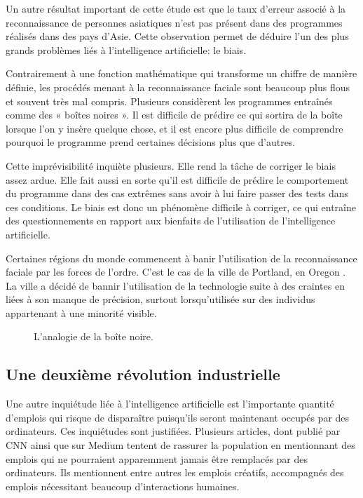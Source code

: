 \documentclass[letterpaper,10pt,french]{sphinxmanual}
\begin{document}
Un autre résultat important de cette étude est que le taux d’erreur associé à la
reconnaissance de personnes asiatiques n’est pas présent dans des programmes
réalisés dans des pays d’Asie. Cette observation permet de déduire l’un des plus
grands problèmes liés à l’intelligence artificielle: le biais.

Contrairement à une fonction mathématique qui transforme un chiffre de manière
définie, les procédés menant à la reconnaissance faciale sont beaucoup plus
flous et souvent très mal compris. Plusieurs considèrent les programmes
entraînés comme des « boîtes noires ». Il est difficile de prédire ce qui sortira
de la boîte lorsque l’on y insère quelque chose, et il est encore plus difficile
de comprendre pourquoi le programme prend certaines décisions plus que d’autres.

Cette imprévisibilité inquiète plusieurs. Elle rend la tâche de corriger le
biais assez ardue. Elle fait aussi en sorte qu’il est difficile de prédire le
comportement du programme dans des cas extrêmes sans avoir à lui faire passer
des tests dans ces conditions. Le biais est donc un phénomène difficile à
corriger, ce qui entraîne des questionnements en rapport aux bienfaits de
l’utilisation de l’intelligence artificielle.

Certaines régions du monde
commencent à banir l’utilisation de la reconnaissance faciale par les forces
de l’ordre. C’est le cas de la ville de Portland, en Oregon .
La ville a décidé de bannir l’utilisation de la technologie suite à des craintes
en liées à son manque de précision, surtout lorsqu’utilisée sur des individus
appartenant à une minorité visible.

\begin{figure}[htbp]
\centering
\capstart

\noindent{}
\caption{L’analogie de la boîte noire.}\label{\detokenize{enonce_sujet:boite-noire}}\end{figure}


\subsection{Une deuxième révolution industrielle}
\label{\detokenize{enonce_sujet:une-deuxieme-revolution-industrielle}}
Une autre inquiétude liée à l’intelligence artificielle est l’importante
quantité d’emplois qui risque de disparaître puisqu’ils seront maintenant
occupés par des ordinateurs. Ces inquiétudes sont justifiées. Plusieurs articles,
dont
publié par CNN ainsi que
sur Medium tentent de rassurer la population en mentionnant des emplois qui ne
pourraient apparemment jamais être remplacés par des ordinateurs. Ils mentionnent
entre autres les emplois créatifs, accompagnés des emplois nécessitant beaucoup
d’interactions humaines.
\end{document}
